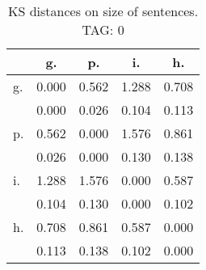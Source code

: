 \begin{table}[h!]
\begin{center}
\begin{tabular}{| l | c | c | c | c |}\hline
 & g. & p. & i. & h. \\\hline
g. & 0.000  & 0.562  & 1.288  & 0.708 \\\hline
 & 0.000  & 0.026  & 0.104  & 0.113 \\\hline
p. & 0.562  & 0.000  & 1.576  & 0.861 \\\hline
 & 0.026  & 0.000  & 0.130  & 0.138 \\\hline
i. & 1.288  & 1.576  & 0.000  & 0.587 \\\hline
 & 0.104  & 0.130  & 0.000  & 0.102 \\\hline
h. & 0.708  & 0.861  & 0.587  & 0.000 \\\hline
 & 0.113  & 0.138  & 0.102  & 0.000 \\\hline
\end{tabular}
\caption{KS distances on size of sentences. TAG: 0}
\end{center}
\end{table}